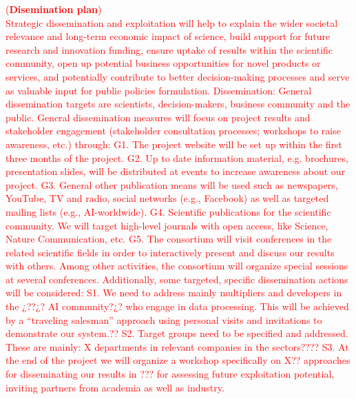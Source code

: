 \documentclass[11pt, a4paper]{article} %
\begin{document}
\textcolor{red}{
({\bf Disemination plan})\\
Strategic dissemination and exploitation will help to explain the
wider societal relevance and long-term economic impact of science,
build support for future research and innovation funding, ensure
uptake of results within the scientific community, open up potential
business opportunities for novel products or services, and potentially
contribute to better decision-making processes and serve as valuable
input for public policies formulation.
Dissemination: General dissemination targets are scientists,
decision-makers, business community and the public.  General
dissemination measures will focus on project results and stakeholder
engagement (stakeholder consultation processes; workshops to raise
awareness, etc.) through:
G1. The project website will be set up within the first three months of the project.
G2. Up to date information material, e.g. brochures, presentation slides, will be distributed at events to increase awareness about our project.
G3. General other publication means will be used such as newspapers, YouTube, TV and radio, social networks (e.g., Facebook) as well as targeted mailing lists (e.g., AI-worldwide). 
G4. Scientific publications for the scientific community. We will target high-level journals with open access, like Science, Nature Communication, etc.
G5. The consortium  will  visit  conferences  in  the related  scientific fields in  order  to  interactively  present  and discuss  our  results  with  others. Among  other  activities,  the  consortium  will  organize  special  sessions  at several conferences.
Additionally, some targeted, specific dissemination actions will be
considered: S1. We need to address mainly multipliers and developers
in the ¿??¿? AI community?¿?  who engage in data processing. This will
be achieved by a “traveling salesman” approach using personal visits
and invitations to demonstrate our system.??  S2. Target groups need
to be specified and addressed.  These are mainly: X departments in
relevant companies in the sectors????  S3. At the end of the project
we will organize a workshop specifically on X?? approaches for
disseminating our results in ??? for assessing future exploitation
potential, inviting partners from academia as well as industry.}
\end{document}
